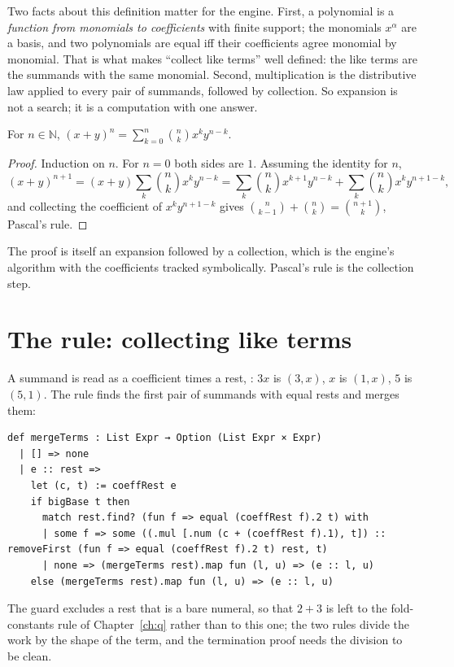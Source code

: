 Two facts about this definition matter for the engine. First, a polynomial is a \emph{function
from monomials to coefficients} with finite support; the monomials $x^\alpha$ are a basis, and two
polynomials are equal iff their coefficients agree monomial by monomial. That is what makes
``collect like terms'' well defined: the like terms are the summands with the same monomial.
Second, multiplication is the distributive law applied to every pair of summands, followed by
collection. So expansion is not a search; it is a computation with one answer.

\begin{theorem}
  For $n \in \mathbb{N}$, $(x + y)^n = \sum_{k=0}^n \binom{n}{k} x^k y^{n-k}$.
\end{theorem}
\begin{proof}
  Induction on $n$. For $n = 0$ both sides are $1$. Assuming the identity for $n$,
  \[
    (x+y)^{n+1} = (x+y)\sum_{k} \binom{n}{k} x^k y^{n-k}
      = \sum_k \binom{n}{k} x^{k+1} y^{n-k} + \sum_k \binom{n}{k} x^k y^{n+1-k},
  \]
  and collecting the coefficient of $x^k y^{n+1-k}$ gives $\binom{n}{k-1} + \binom{n}{k} =
  \binom{n+1}{k}$, Pascal's rule.
\end{proof}

The proof is itself an expansion followed by a collection, which is the engine's algorithm with
the coefficients tracked symbolically. Pascal's rule is the collection step.

\section{The rule: collecting like terms}

A summand is read as a coefficient times a rest, : $3x$ is $(3, x)$, $x$ is
$(1, x)$, $5$ is $(5, 1)$. The rule finds the first pair of summands with equal rests and merges
them:

\begin{verbatim}
def mergeTerms : List Expr → Option (List Expr × Expr)
  | [] => none
  | e :: rest =>
    let (c, t) := coeffRest e
    if bigBase t then
      match rest.find? (fun f => equal (coeffRest f).2 t) with
      | some f => some ((.mul [.num (c + (coeffRest f).1), t]) :: removeFirst (fun f => equal (coeffRest f).2 t) rest, t)
      | none => (mergeTerms rest).map fun (l, u) => (e :: l, u)
    else (mergeTerms rest).map fun (l, u) => (e :: l, u)
\end{verbatim}

The guard  excludes a rest that is a bare numeral, so that $2 + 3$ is left to the
fold-constants rule of Chapter~\ref{ch:q} rather than to this one; the two rules divide the work
by the shape of the term, and the termination proof needs the division to be clean.

